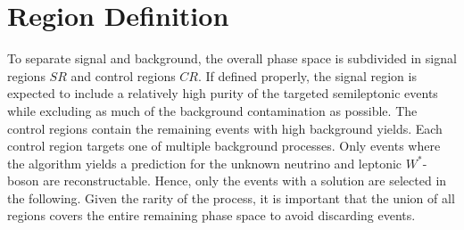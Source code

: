 \documentclass[bachelor,ngerman,english]{GAUBM}
\begin{document}


\section{Region Definition}
\label{sec:event_selection:region_definition}
To separate signal and background, the overall phase space is subdivided in signal regions $SR$ and control regions $CR$. If defined properly, the signal region is expected to include a relatively high purity of the targeted semileptonic \ttHWW events while excluding as much of the background contamination as possible. The control regions contain the remaining events with high background yields. Each control region targets one of multiple background processes. Only events where the \NW algorithm yields a prediction for the unknown neutrino and leptonic $W^*$-boson are reconstructable. Hence, only the events with a \NW solution are selected in the following. Given the rarity of the \ttHWW process, it is important that the union of all regions covers the entire remaining phase space to avoid discarding events. 
\end{document}
